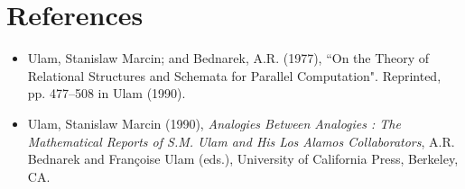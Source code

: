 \documentclass[12pt]{article}
\begin{document}
\section{References}

\begin{itemize}
\item
Ulam, Stanislaw Marcin; and Bednarek, A.R. (1977), ``On the Theory of Relational Structures and Schemata for Parallel Computation".  Reprinted, pp. 477--508 in Ulam (1990).
\item
Ulam, Stanislaw Marcin (1990), \textit{Analogies Between Analogies : The Mathematical Reports of S.M. Ulam and His Los Alamos Collaborators}, A.R. Bednarek and Fran\c{c}oise Ulam (eds.), University of California Press, Berkeley, CA.
\end{itemize}

\end{document}
